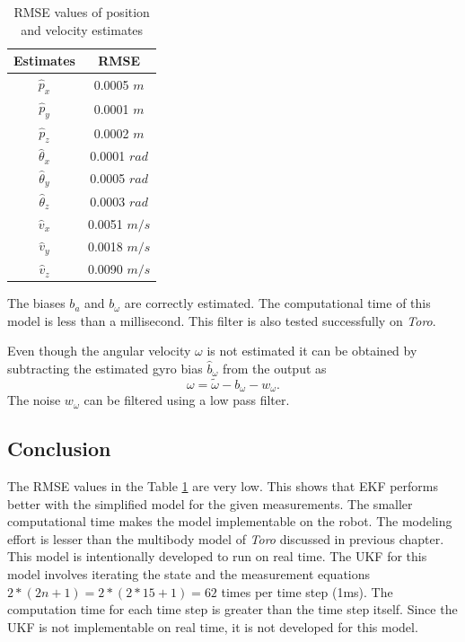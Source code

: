 \begin{table}
    \centering
    \begin{tabular}{|c|c|}
    \hline
    Estimates &RMSE \\ \hline
    $\hat p_x$ &0.0005 $m$\\
    $\hat p_y$ &0.0001 $m$\\
    $\hat p_z$ &0.0002 $m$\\
    $\hat\theta_x$ &0.0001 $rad$\\
    $\hat\theta_y$ &0.0005 $rad$\\
    $\hat\theta_z$ &0.0003 $rad$\\ 
    $\hat v_x$ &0.0051 $m/s$\\
    $\hat v_y$ &0.0018 $m/s$\\
    $\hat v_z$ &0.0090 $m/s$\\\hline
    \end{tabular} \hspace{1cm}
    \caption{RMSE values of position and velocity estimates}
    \label{tab:simp_rmse}
\end{table}

The biases $b_a$ and $b_\omega$ are correctly estimated. The computational time of this model is less than a millisecond. This filter is also tested successfully on \emph{Toro}. 

Even though the angular velocity $\omega$ is not estimated it can be obtained by subtracting the estimated gyro bias $\hat b_\omega$ from the output as
$$ \omega = \tilde{\omega} - b_\omega - w_\omega.$$ 
The noise $w_\omega$ can be filtered using a low pass filter.

\subsection{Conclusion}
The RMSE values in the Table \ref{tab:simp_rmse} are very low. This shows that EKF performs better with the simplified model for the given measurements. The smaller computational time makes the model implementable on the robot. The modeling effort is lesser than the multibody model of \emph{Toro} discussed in previous chapter. This model is intentionally developed to run on real time. The UKF for this model involves iterating the state and the measurement equations $2*(2n+1)=2*(2*15+1)=62$ times per time step (1ms). The computation time for each time step is greater than the time step itself. Since the UKF is not implementable on real time, it is not developed for this model.